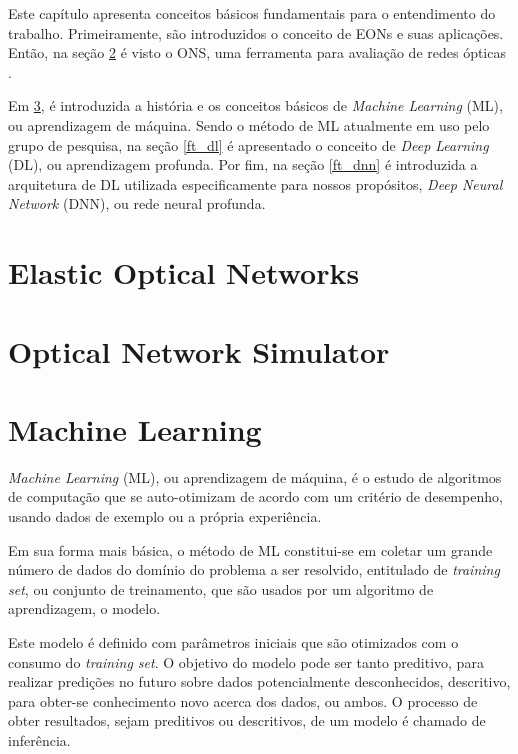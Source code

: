 Este capítulo apresenta conceitos básicos fundamentais para o entendimento do trabalho. Primeiramente, são introduzidos o conceito de EONs e suas aplicações. Então, na seção \ref{ft_ons} é visto o ONS, uma ferramenta para avaliação de redes ópticas \cite{costa2016ons}.

Em \ref{ft_ml}, é introduzida a história e os conceitos básicos de \textit{Machine Learning} (ML), ou aprendizagem de máquina. Sendo o método de ML atualmente em uso pelo grupo de pesquisa, na seção \ref{ft_dl} é apresentado o conceito de \textit{Deep Learning} (DL), ou aprendizagem profunda. Por fim, na seção \ref{ft_dnn} é introduzida a arquitetura de DL utilizada especificamente para nossos propósitos, \textit{Deep Neural Network} (DNN), ou rede neural profunda.

\section{Elastic Optical Networks}%
\label{ft_eon}

\section{Optical Network Simulator}%
\label{ft_ons}

\section{Machine Learning}%
\label{ft_ml}

\textit{Machine Learning} (ML), ou aprendizagem de máquina, é o estudo de algoritmos de computação que se auto-otimizam de acordo com um critério de desempenho, usando dados de exemplo ou a própria experiência. \cite{mitchell1997ml} \cite{alpaydin2020introduction}

Em sua forma mais básica, o método de ML constitui-se em coletar um grande número de dados do domínio do problema a ser resolvido, entitulado de \textit{training set}, ou conjunto de treinamento, que são usados por um algoritmo de aprendizagem, o modelo.

Este modelo é definido com parâmetros iniciais que são otimizados com o consumo do \textit{training set}. O objetivo do modelo pode ser tanto preditivo, para realizar predições no futuro sobre dados potencialmente desconhecidos, descritivo, para obter-se conhecimento novo acerca dos dados, ou ambos. O processo de obter resultados, sejam preditivos ou descritivos, de um modelo é chamado de inferência.

